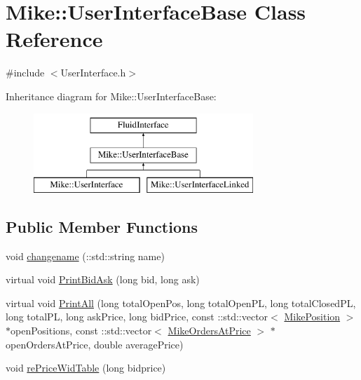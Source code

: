 \hypertarget{class_mike_1_1_user_interface_base}{}\section{Mike\+:\+:User\+Interface\+Base Class Reference}
\label{class_mike_1_1_user_interface_base}


{\ttfamily \#include $<$User\+Interface.\+h$>$}

Inheritance diagram for Mike\+:\+:User\+Interface\+Base\+:\begin{figure}[H]
\begin{center}
\leavevmode
\includegraphics[height=3.000000cm]{class_mike_1_1_user_interface_base}
\end{center}
\end{figure}
\subsection*{Public Member Functions}
\begin{DoxyCompactItemize}
\item 
void \hyperlink{class_mike_1_1_user_interface_base_a8db9431a5f9fc2683908c5d4cf086623}{changename} (\+::std\+::string name)
\item 
virtual void \hyperlink{class_mike_1_1_user_interface_base_a3a1d4bc6ce2f817327d39e48340ae23c}{Print\+Bid\+Ask} (long bid, long ask)
\item 
virtual void \hyperlink{class_mike_1_1_user_interface_base_a1386d2a22c47d96264ed2549da036de3}{Print\+All} (long total\+Open\+Pos, long total\+Open\+PL, long total\+Closed\+PL, long total\+PL, long ask\+Price, long bid\+Price, const \+::std\+::vector$<$ \hyperlink{class_mike_1_1_mike_position}{Mike\+Position} $>$ $\ast$open\+Positions, const \+::std\+::vector$<$ \hyperlink{class_mike_1_1_mike_orders_at_price}{Mike\+Orders\+At\+Price} $>$ $\ast$open\+Orders\+At\+Price, double average\+Price)
\item 
void \hyperlink{class_mike_1_1_user_interface_base_a5208d9aa15d5b83eac5aca6e885dd23f}{re\+Price\+Wid\+Table} (long bidprice)
\end{DoxyCompactItemize}
